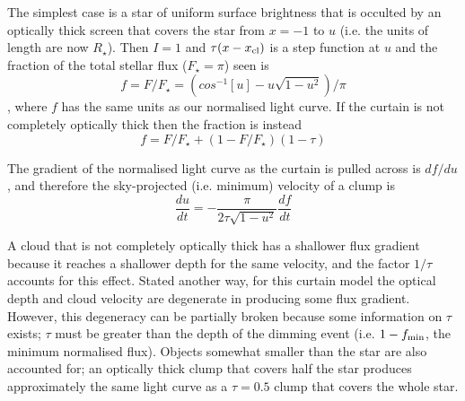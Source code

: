 \documentclass[]{rsos}
\begin{document}

The simplest case is a star of uniform surface brightness that is occulted by an
optically thick screen that covers the star from $x=-1$ to $u$ (i.e. the units of length
are now $R_\star$). Then $I=1$ and $\tau(x-x_{\rm cl})$ is a step function at $u$ and the
fraction of the total stellar flux ($F_\star = \pi$) seen is
\begin{equation}
  f = F/F_\star = (cos^{-1}[u] - u\sqrt{1-u^2})/\pi
\end{equation}
\cite{2006ApJ...644..510W}, where $f$ has the same units as our normalised light
curve. If the curtain is not completely optically thick then the fraction is instead
\begin{equation}
 f = F/F_\star + (1-F/F_\star)(1-\tau)
\end{equation}

The gradient of the normalised light curve as the curtain is pulled across is $df/du$,
and therefore the sky-projected (i.e. minimum) velocity of a clump is
\begin{equation}
  \frac{du}{dt} = -\frac{\pi}{2 \tau \sqrt{1-u^2}}\frac{df}{dt}
\end{equation}

A cloud that is not completely optically thick has a shallower flux gradient because it
reaches a shallower depth for the same velocity, and the factor $1/\tau$ accounts for
this effect. Stated another way, for this curtain model the optical depth and cloud
velocity are degenerate in producing some flux gradient. However, this degeneracy can be
partially broken because some information on $\tau$ exists; $\tau$ must be greater than
the depth of the dimming event (i.e. $1- f_{\rm min}$, the minimum normalised
flux). Objects somewhat smaller than the star are also accounted for; an optically thick
clump that covers half the star produces approximately the same light curve as a
$\tau=0.5$ clump that covers the whole star.
\end{document}
